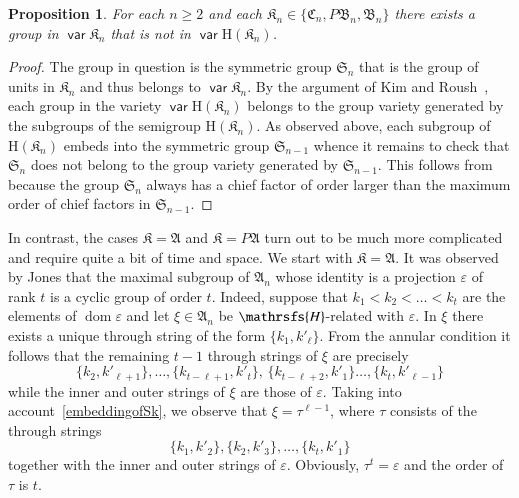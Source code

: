 \documentclass[preprint,1p,times]{elsarticle}
\DeclareMathOperator{\dom}{dom} \DeclareMathOperator{\ran}{ran}
\DeclareMathOperator{\var}{\mathsf{var}}
\numberwithin{equation}{section}
\newtheorem{Prop}[Thm]{Proposition}
\theoremstyle{remark}
\def\Hc{\mathrsfs{H}}
\def\ep{\varepsilon}
\def\H{\mathrm H}
\def\A{\mathfrak{A}}
\def\C{\mathfrak{C}}
\def\B{\mathfrak{B}}
\def\K{\mathfrak{K}}
\def\Sim{\mathfrak{S}}
\begin{document}
\begin{Prop}
\label{groups in the gap} For each $n\ge 2$ and each $\mathfrak{K}_n\in \{\C_n,P\B_n,\B_n\}$ there exists a group in
$\var\mathfrak{K}_n$ that is not in $\var\H(\mathfrak{K}_n)$.
\end{Prop}
\begin{proof}
The group in question is the symmetric group $\Sim_n$ that is the group of units in $\mathfrak{K}_n$ and thus belongs
to $\var\mathfrak{K}_n$. By the argument of Kim and Roush~\cite{KR}, each group in the variety $\var\H(\mathfrak{K}_n)$
belongs to the group variety generated by the subgroups of the semigroup $\H(\mathfrak{K}_n)$. As observed above, each
subgroup of $\H(\mathfrak{K}_n)$ embeds into the symmetric group $\Sim_{n-1}$ whence it remains to check that $\Sim_n$
does not belong to the group variety generated by $\Sim_{n-1}$. This follows from \cite[Theorem 51.2]{Ne} because the
group $\Sim_n$ always has a chief factor of order larger than the maximum order of chief factors in $\Sim_{n-1}$.
\end{proof}


In contrast, the cases $\K=\A$ and $\K=P\A$ turn out to be much more  complicated and require quite a bit of time and
space. We start with $\K=\A$. It was observed by Jones \cite{jones} that the maximal subgroup of $\A_n$ whose identity
is a projection $\ep$ of rank $t$ is a cyclic group of order $t$. Indeed, suppose that $k_1<k_2<\dots<k_t$ are the
elements of $\dom \ep$ and let $\xi\in \A_n$ be $\Hc$-related with $\ep$. In $\xi$ there exists a unique through string
of the form $\{k_1,k'_\ell\}$. From the annular condition it follows that the remaining $t-1$ through strings of $\xi$
are precisely
$$\{k_2,k'_{\ell+1}\},\dots,\{k_{t-\ell+1},k'_t\},\,\{k_{t-\ell+2},k'_1\}\dots,
\{k_t,k'_{\ell-1}\}$$ while the inner and outer strings of $\xi$ are those of $\ep$. Taking into
account~\eqref{embeddingofSk}, we observe that $\xi=\tau^{\ell-1}$, where $\tau$ consists of the through strings
$$\{k_1,k'_2\},\{k_2,k'_3\},\dots,\{k_t,k'_1\}$$
together with the inner and outer strings of $\ep$. Obviously,
 $\tau^t=\ep$ and the order of $\tau$ is $t$.
\end{document}
